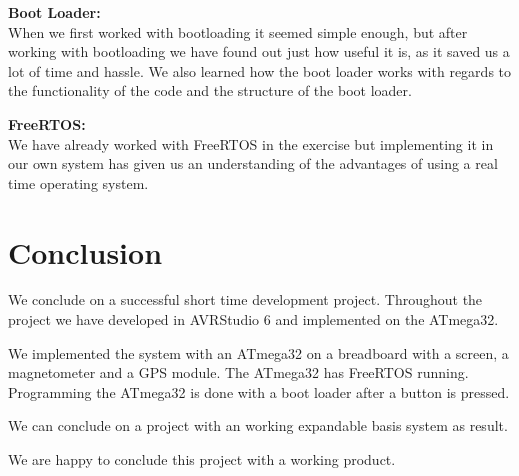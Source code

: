 \textbf{Boot Loader:}\\
When we first worked with bootloading it seemed simple enough, but after working with bootloading we have found out just how useful it is, as it saved us a lot of time and hassle. We also learned how the boot loader works with regards to the functionality of the code and the structure of the boot loader.

\textbf{FreeRTOS:}\\
We have already worked with FreeRTOS in the exercise but implementing it in our own system has given us an understanding of the advantages of using a real time operating system. 


\chapter{Conclusion}
We conclude on a successful short time development project. Throughout the project we have developed in AVRStudio 6 and implemented on the ATmega32. 

We implemented the system with an ATmega32 on a breadboard with a screen, a magnetometer and a GPS module. The ATmega32 has FreeRTOS running. Programming the ATmega32 is done with a boot loader after a button is pressed.

We can conclude on a project with an working expandable basis system as result.

We are happy to conclude this project with a working product.

